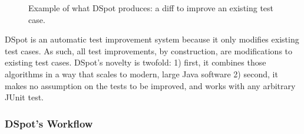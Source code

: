 \documentclass[table,xcdraw,smallextended]{svjour3}
\newcommand{\dspot}{DSpot\xspace}
\newcommand{\junit}{JUnit\xspace}
\begin{document}
\begin{figure}[!ht]
\centering{}
    \caption{Example of what \dspot produces: a diff to improve an existing test case.}
    \label{fig:diff-protostuff}
\end{figure}

\dspot is an automatic test improvement system because it only modifies existing test cases. As such, all test improvements, by construction, are modifications to existing test cases.
\dspot's novelty is twofold: 1) first, it combines those algorithms in a way that scales to modern, large Java software 2) second, it makes no assumption on the tests to be improved, and works with any arbitrary \junit test.


\subsubsection{\dspot's Workflow}
\end{document}
